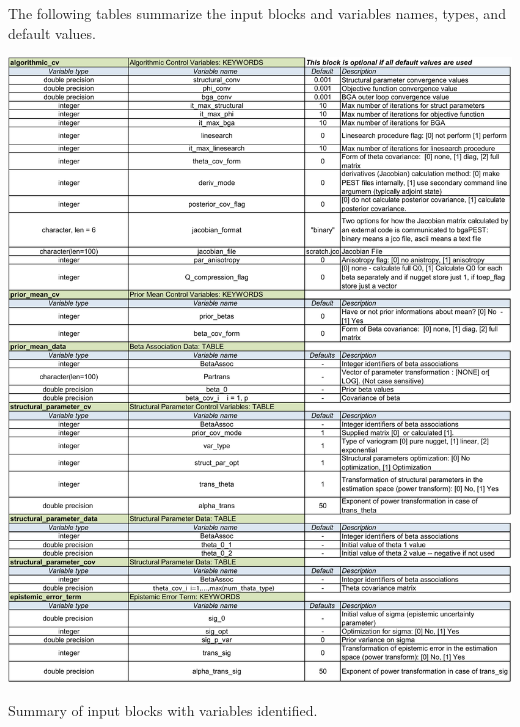 \documentclass[11pt,oneside,onecolumn]{usgsreport}
\begin{document}
\begin{appendix}
The following tables summarize the input blocks and variables
names, types, and default values.

\begin{table}[H]
\begin{center}\includegraphics[scale=0.5]{Variables_for_documentation1}\end{center}

\caption{\label{tab:variables1-1}Summary of input blocks with variables identified.}
\end{table}



\end{appendix}
\end{document}
